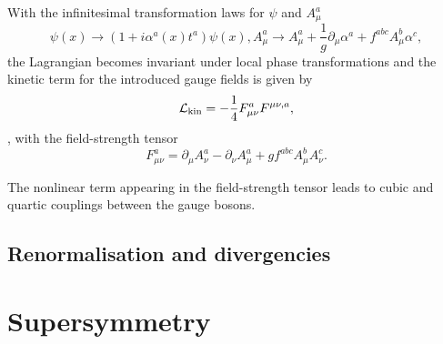 With the infinitesimal transformation laws for $\psi$ and $A^a_\mu$
\begin{equation}
	\psi(x) \rightarrow (1 + i\alpha^a(x)t^a)\psi(x),
	A^a_\mu \rightarrow A^a_\mu + \frac{1}{g	}\partial_\mu\alpha^a + f^{abc}A^b_\mu\alpha^c, 
\end{equation}
the Lagrangian becomes invariant under local phase transformations and the kinetic term for the introduced gauge fields is given by
\begin{equation}
	\mathcal{L}_\mathrm{kin} = -\frac{1}{4} F^a_{\mu\nu} F^{\mu\nu,a},
\end{equation},
with the field-strength tensor 
\begin{equation}
	F^a_{\mu\nu} = \partial_\mu A^a_\nu - \partial_\nu A^a_\mu + gf^{abc}A^b_\mu A^c_\nu.
\end{equation}

The nonlinear term appearing in the field-strength tensor leads to cubic and quartic couplings between the gauge bosons.





\subsection{Renormalisation and divergencies}
 

\section{Supersymmetry}
